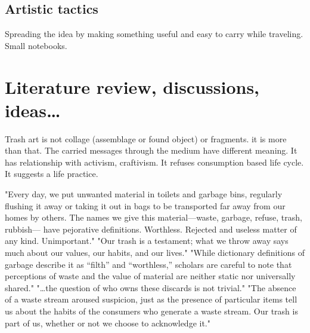 \documentclass[12pt]{article}
\begin{document}
\subsection{Artistic tactics}
Spreading the idea by making something useful and easy to carry while traveling. Small notebooks.  

\section{Literature review, discussions, ideas\ldots}
Trash art is not collage (assemblage or found object) or fragments. it is more than that. The carried messages through the medium have different meaning. It has relationship with activism, craftivism. It refuses consumption based life cycle. It suggests a life practice.

"Every day, we put unwanted material in toilets and garbage bins, regularly flushing it away or taking it out in bags to be transported far away from our homes by others. The names we give this material---waste, garbage, refuse, trash, rubbish--- have pejorative definitions. Worthless. Rejected and useless matter of any kind. Unimportant." "Our trash is a testament; what we throw away says much about our values, our habits, and our lives." "While dictionary definitions of garbage describe it as “filth” and “worthless,” scholars are careful to note that perceptions of waste and the value of material are neither static nor universally shared." "\ldots the question of who owns these discards is not trivial." "The absence of a waste stream aroused suspicion, just as the presence of particular items tell us about the habits of the consumers who generate a waste stream. Our trash is part of us, whether or not we choose to acknowledge it." \cite{zimring2012encyclopedia}

\end{document}
